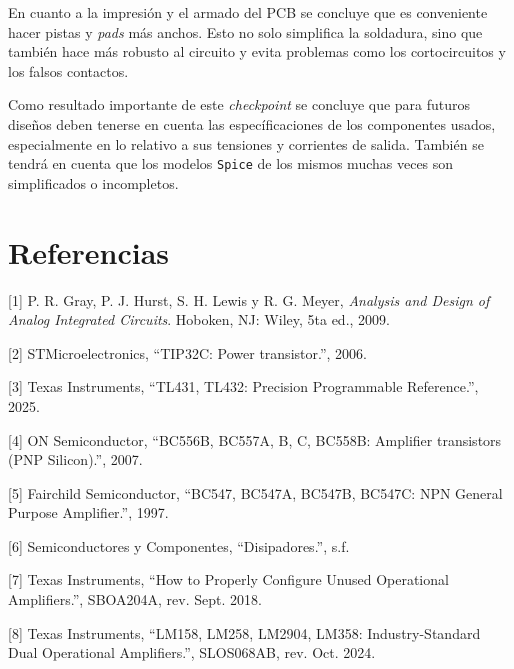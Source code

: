 \documentclass[a4paper,12pt]{article}
\begin{document}
En cuanto a la impresión y el armado del PCB se concluye que es conveniente hacer pistas y \textit{pads} más anchos. Esto no solo simplifica la soldadura, sino que también hace más robusto al circuito y evita problemas como los cortocircuitos y los falsos contactos.

Como resultado importante de este \textit{checkpoint} se concluye que para futuros diseños deben tenerse en cuenta las específicaciones de los componentes usados, especialmente en lo relativo a sus tensiones y corrientes de salida. También se tendrá en cuenta que los modelos \texttt{Spice} de los mismos muchas veces son simplificados o incompletos. 

\section{Referencias}

[1] P. R. Gray, P. J. Hurst, S. H. Lewis y R. G. Meyer, \textit{Analysis and Design of Analog Integrated Circuits}. Hoboken, NJ: Wiley, 5ta ed., 2009.

[2] STMicroelectronics, ``TIP32C: Power transistor.'', 2006.

[3] Texas Instruments, ``TL431, TL432: Precision Programmable Reference.'', 2025.

[4] ON Semiconductor, ``BC556B, BC557A, B, C, BC558B: Amplifier transistors (PNP Silicon).'', 2007.

[5] Fairchild Semiconductor, ``BC547, BC547A, BC547B, BC547C: NPN General Purpose Amplifier.'', 1997.

[6] Semiconductores y Componentes, ``Disipadores.'', s.f.

[7] Texas Instruments, ``How to Properly Configure Unused Operational Amplifiers.'', SBOA204A, rev. Sept. 2018.

[8] Texas Instruments, ``LM158, LM258, LM2904, LM358: Industry-Standard Dual Operational Amplifiers.'', SLOS068AB, rev. Oct. 2024.
\end{document}
